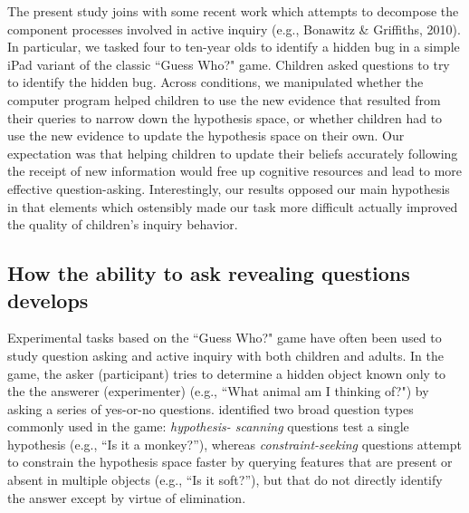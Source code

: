 \documentclass[10pt,letterpaper]{article}
\begin{document}
\nocite{Bonawitz:2010pb}
The present study joins with some recent work which attempts to decompose the 
component processes involved in active inquiry (e.g., Bonawitz \& Griffiths, 2010).  
In particular, we tasked four to ten-year olds to identify a hidden bug in
a simple iPad variant of the classic ``Guess Who?" game. Children asked questions to try 
to identify the hidden bug. Across conditions, we manipulated whether the computer program 
helped children to use the new evidence that resulted from their queries to narrow down the
hypothesis space, or whether children had to use the new evidence to update the hypothesis space
on their own.  Our expectation was that helping children to update their beliefs accurately following the 
receipt of new information would free up cognitive resources and lead to more effective question-asking. 
Interestingly, our results opposed our main hypothesis in that elements which 
ostensibly made our task more difficult actually improved the quality of children's inquiry 
behavior.  

\subsection{How the ability to ask revealing questions develops}

Experimental tasks based on the ``Guess Who?" game have often been used to
study question asking and active inquiry with both children and adults.
In the game, the asker (participant) tries to determine a hidden object known
only to the the answerer (experimenter) (e.g., ``What animal am I thinking of?")
by asking a series of yes-or-no questions.
 identified two broad question types commonly used in the game: \emph{hypothesis-
scanning} questions test a single hypothesis (e.g., ``Is it a monkey?''), whereas 
\emph{constraint-seeking} questions attempt to constrain the hypothesis space faster by 
querying features that are present or absent in multiple objects (e.g., ``Is it soft?''), 
but that do not directly identify the answer except by virtue of elimination. 
\end{document}
